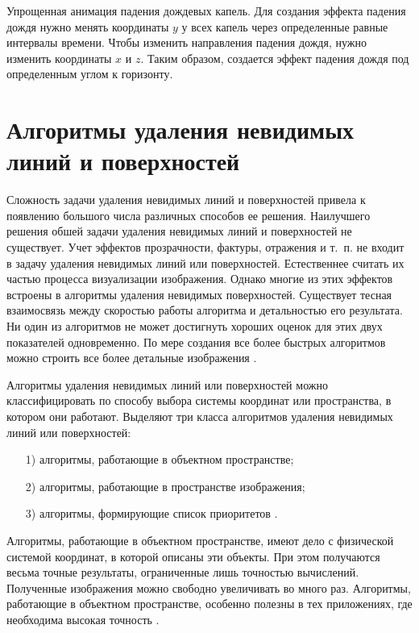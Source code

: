 Упрощенная анимация падения дождевых капель. 
Для создания эффекта падения дождя нужно менять координаты $y$ у всех капель через определенные равные интервалы времени.
Чтобы изменить направления падения дождя, нужно изменить координаты $x$ и $z$. 
Таким образом, создается эффект падения дождя под определенным углом к горизонту.

\section{Алгоритмы удаления невидимых линий и поверхностей}
\label{sec:z_buffer}

Сложность задачи удаления невидимых линий и поверхностей привела к появлению большого числа различных способов ее решения. 
Наилучшего решения обшей задачи удаления невидимых линий и поверхностей не существует. 
Учет эффектов прозрачности, фактуры, отражения и т.~п. не входит в задачу удаления невидимых линий или поверхностей. 
Естественнее считать их частью процесса визуализации изображения. 
Однако многие из этих эффектов встроены в алгоритмы удаления невидимых поверхностей. 
Существует тесная взаимосвязь между скоростью работы алгоритма и детальностью его результата. 
Ни один из алгоритмов не может достигнуть хороших оценок для этих двух показателей одновременно. 
По мере создания все более быстрых алгоритмов можно строить все более детальные изображения \cite{Demin2005}.

Алгоритмы удаления невидимых линий или поверхностей можно классифицировать по способу выбора системы координат или пространства, в котором они работают. Выделяют три класса алгоритмов удаления невидимых линий или поверхностей:

\begin{enumerate}
\item[1)]
алгоритмы, работающие в объектном пространстве;
\item[2)]
алгоритмы, работающие в пространстве изображения;
\item[3)]
алгоритмы, формирующие список приоритетов \cite{Demin2005}.
\end{enumerate}

Алгоритмы, работающие в объектном пространстве, имеют дело с физической системой координат, в которой описаны эти объекты. 
При этом получаются весьма точные результаты, ограниченные лишь точностью вычислений. 
Полученные изображения можно свободно увеличивать во много раз. 
Алгоритмы, работающие в объектном пространстве, особенно полезны в тех приложениях, где необходима высокая точность \cite{Demin2005}.

